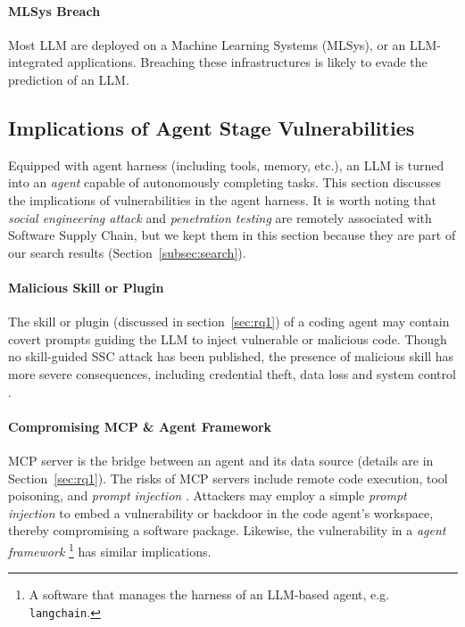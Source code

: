 \paragraph*{MLSys Breach}
Most LLM are deployed on a 
Machine Learning Systems (MLSys), or an LLM-integrated applications.
Breaching these infrastructures is likely to evade the prediction
of an LLM. 

\subsection{Implications of Agent Stage Vulnerabilities}
\label{subsec:impagent}

\par Equipped with agent harness (including tools, memory, etc.),
an LLM is turned into an \textit{agent} capable of autonomously 
completing tasks. This section discusses the implications of
vulnerabilities in the agent harness. It is worth noting that 
\textit{social engineering attack}
and \textit{penetration testing} are remotely associated with Software
Supply Chain, but we kept them in this section because they are
part of our search results (Section~\ref{subsec:search}). 

\paragraph*{Malicious Skill or Plugin} 
The skill or plugin (discussed in section~\ref{sec:rq1}) of a coding agent
may contain covert prompts guiding the LLM to inject vulnerable
or malicious code. Though no skill-guided SSC attack has been published,
the presence of malicious skill has more severe consequences, including
credential theft, data loss and system control \citep{skillvulns}.

\paragraph*{Compromising MCP \& Agent Framework}
MCP server is the bridge between an agent and its data source (details
are in Section~\ref{sec:rq1}). The risks of MCP servers include remote
code execution, tool poisoning, and \textit{prompt injection}
\citep{10.1145/3814959,mcpvulns}. Attackers may employ a simple
\textit{prompt injection} to embed a vulnerability or backdoor
in the code agent's workspace, thereby compromising a software package.
Likewise, the vulnerability in a \textit{agent framework}
\footnote{A software that manages the harness of an LLM-based agent, e.g. \texttt{langchain}.}
has similar implications.

